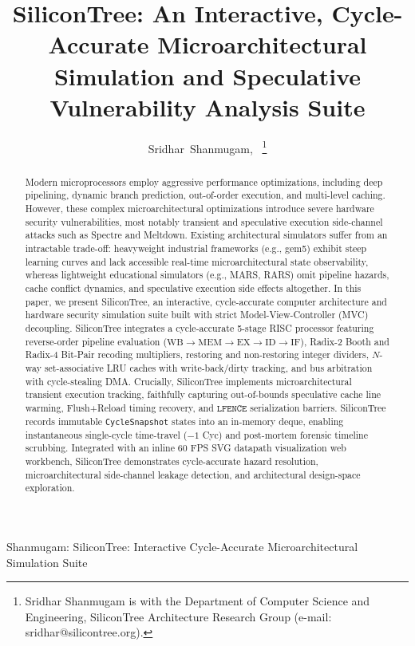 \documentclass[journal,twocolumn,10pt]{IEEEtran}
\begin{document}
\title{SiliconTree: An Interactive, Cycle-Accurate Microarchitectural Simulation and Speculative Vulnerability Analysis Suite}

\author{Sridhar~Shanmugam,~
\thanks{Sridhar Shanmugam is with the Department of Computer Science and Engineering, SiliconTree Architecture Research Group (e-mail: sridhar@silicontree.org).}}

%
{Shanmugam: SiliconTree: Interactive Cycle-Accurate Microarchitectural Simulation Suite}

\maketitle

\begin{abstract}
Modern microprocessors employ aggressive performance optimizations, including deep pipelining, dynamic branch prediction, out-of-order execution, and multi-level caching. However, these complex microarchitectural optimizations introduce severe hardware security vulnerabilities, most notably transient and speculative execution side-channel attacks such as Spectre and Meltdown. Existing architectural simulators suffer from an intractable trade-off: heavyweight industrial frameworks (e.g., gem5) exhibit steep learning curves and lack accessible real-time microarchitectural state observability, whereas lightweight educational simulators (e.g., MARS, RARS) omit pipeline hazards, cache conflict dynamics, and speculative execution side effects altogether. In this paper, we present SiliconTree, an interactive, cycle-accurate computer architecture and hardware security simulation suite built with strict Model-View-Controller (MVC) decoupling. SiliconTree integrates a cycle-accurate 5-stage RISC processor featuring reverse-order pipeline evaluation ($\text{WB} \to \text{MEM} \to \text{EX} \to \text{ID} \to \text{IF}$), Radix-2 Booth and Radix-4 Bit-Pair recoding multipliers, restoring and non-restoring integer dividers, $N$-way set-associative LRU caches with write-back/dirty tracking, and bus arbitration with cycle-stealing DMA. Crucially, SiliconTree implements microarchitectural transient execution tracking, faithfully capturing out-of-bounds speculative cache line warming, Flush+Reload timing recovery, and $\texttt{LFENCE}$ serialization barriers. SiliconTree records immutable \texttt{CycleSnapshot} states into an in-memory deque, enabling instantaneous single-cycle time-travel ($-1$ Cyc) and post-mortem forensic timeline scrubbing. Integrated with an inline 60 FPS SVG datapath visualization web workbench, SiliconTree demonstrates cycle-accurate hazard resolution, microarchitectural side-channel leakage detection, and architectural design-space exploration.
\end{abstract}
\end{document}
